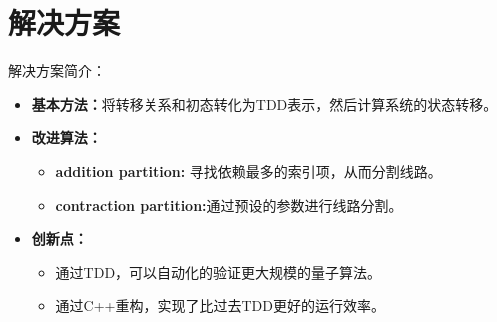 \documentclass[aspectratio=1610]{ctexbeamer}
\begin{document}
\section{解决方案}
\begin{frame}{解决方案简介：}
    \begin{itemize}[itemsep=10pt]
        \item \textbf{基本方法：}将转移关系和初态转化为TDD表示，然后计算系统的状态转移。
        \item \textbf{改进算法：}
        \begin{itemize}[label=$\bullet$]
            \item \textbf{addition partition:} 寻找依赖最多的索引项，从而分割线路。
            \item \textbf{contraction partition:}通过预设的参数进行线路分割。
        \end{itemize}
        \item \textbf{创新点：}
        \begin{itemize}[label=$\bullet$]
            \item 通过TDD，可以自动化的验证更大规模的量子算法。
            \item 通过C++重构，实现了比过去TDD更好的运行效率。
        \end{itemize}
    \end{itemize}
\end{frame}
\end{document}
